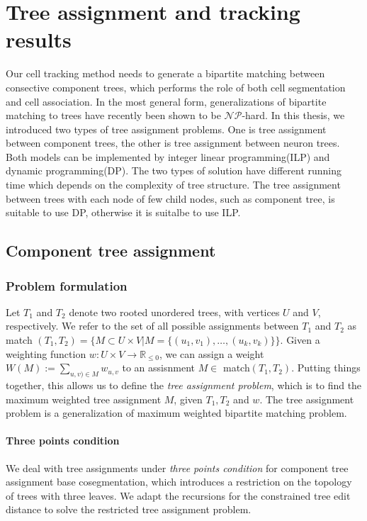 \chapter{Tree assignment and tracking results} \label{chpt:treeassign}
Our cell tracking method needs to generate a bipartite matching \cite{mosig2009tracking, Xiao:2011} between consective component trees, which performs the role of both cell segmentation and cell association. In the most general form, generalizations of bipartite matching to trees have recently been shown to be $\mathcal{NP}$-hard\cite{canzar2011tree}.
In this thesis, we introduced two types of tree assignment problems. One is tree assignment between component trees, the other is tree assignment between neuron trees. Both models can be implemented by integer linear programming(ILP) and dynamic programming(DP). The two types of solution have different running time which depends on the complexity of tree structure. The tree assignment between trees with each node of few child nodes, such as component tree, is suitable to use DP, otherwise it is suitalbe to use ILP.

\section{Component tree assignment}
\subsection{Problem formulation}
Let $T_1$ and $T_2$ denote two rooted unordered trees, with vertices $U$ and $V$, respectively.  We refer to the set of all possible assignments between $T_1$ and $T_2$ as match $(T_1,T_2) =\Big\{M \subset U \times V | M = \{(u_1,v_1),\ldots,(u_k,v_k)\}\Big\}$. Given a weighting function $w:U\times V \to \mathbb{R}_{\le 0}$, we can assign a weight $W(M) := \sum_{u,v)\in M}w_{u,v}$ to an assisnment $M \in$ match$(T_1,T_2)$. Putting things together, this allows us to define the \emph{tree assignment problem}, which is to find the maximum weighted tree assignment $M$, given $T_1,T_2$ and $w$. The tree assignment problem is a generalization of maximum weighted bipartite matching problem.
\subsubsection{Three points condition}
We deal with tree assignments under \emph{three points condition} for component tree assignment base cosegmentation, which introduces a restriction on the topology of trees with three leaves. We adapt the recursions for the constrained tree edit distance to solve the restricted tree assignment problem.

